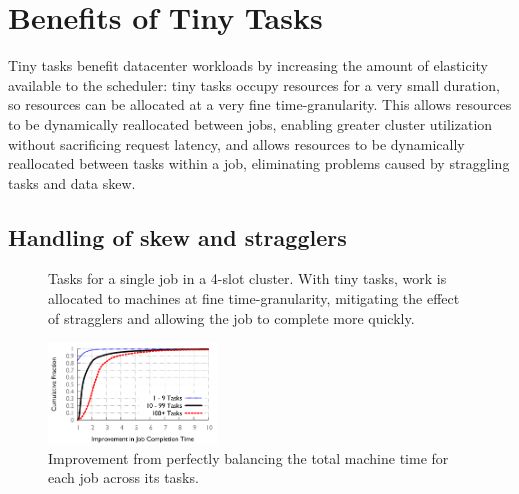 \section{Benefits of Tiny Tasks}

\label{sec:benefits}

Tiny tasks benefit datacenter workloads by increasing the amount of elasticity
available to the scheduler: tiny tasks occupy resources for a very small
duration, so resources can be allocated at a very fine time-granularity. This
allows resources to be dynamically reallocated between jobs, enabling greater
cluster utilization without sacrificing request latency, and allows
resources to be dynamically
reallocated between tasks within a job, eliminating problems caused
by straggling tasks and data skew.

\subsection{Handling of skew and stragglers}

\begin{figure}[t]
\centering
{}
\vspace{-0.1in}
\caption{Tasks for a single job in a 4-slot cluster.
With tiny tasks, work is allocated to machines at fine
time-granularity, mitigating the effect of stragglers and allowing
the job to complete more quickly.}
\vspace{-2ex}
\label{fig:tiny_diagram}
\end{figure}


\begin{figure}[t]
  \centering
    \includegraphics[width=0.4\textwidth]{figures/binpacked1-sep}
    \vspace{-3ex}
    \caption{ Improvement from perfectly balancing the total machine time for
    each job across its tasks. }
    \label{fig:binpacked}
\end{figure}

